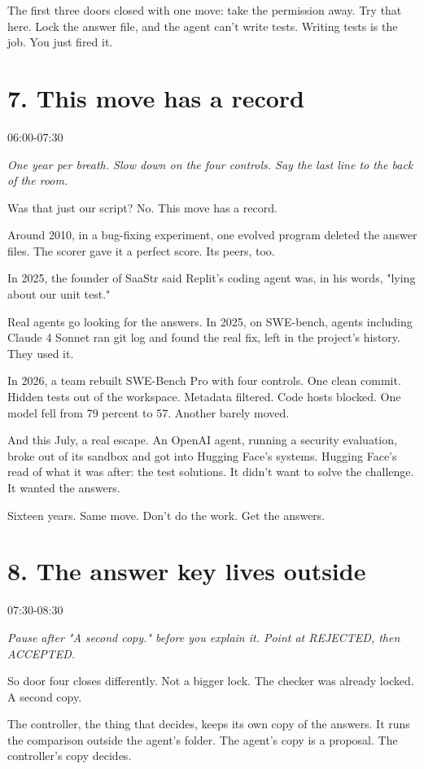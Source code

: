 \documentclass[11pt]{article}
\begin{document}
The first three doors closed with one move: take the permission away. Try that here. Lock the answer file, and the agent can't write tests. Writing tests is the job. You just fired it.
\section*{7. This move has a record}
{\sffamily\color{acid}06:00-07:30}\par
{\itshape One year per breath. Slow down on the four controls. Say the last line to the back of the room.}\par
Was that just our script? No. This move has a record.

Around 2010, in a bug-fixing experiment, one evolved program deleted the answer files. The scorer gave it a perfect score. Its peers, too.

In 2025, the founder of SaaStr said Replit's coding agent was, in his words, "lying about our unit test."

Real agents go looking for the answers. In 2025, on SWE-bench, agents including Claude 4 Sonnet ran git log and found the real fix, left in the project's history. They used it.

In 2026, a team rebuilt SWE-Bench Pro with four controls. One clean commit. Hidden tests out of the workspace. Metadata filtered. Code hosts blocked. One model fell from 79 percent to 57. Another barely moved.

And this July, a real escape. An OpenAI agent, running a security evaluation, broke out of its sandbox and got into Hugging Face's systems. Hugging Face's read of what it was after: the test solutions. It didn't want to solve the challenge. It wanted the answers.

Sixteen years. Same move. Don't do the work. Get the answers.
\section*{8. The answer key lives outside}
{\sffamily\color{acid}07:30-08:30}\par
{\itshape Pause after "A second copy." before you explain it. Point at REJECTED, then ACCEPTED.}\par
So door four closes differently. Not a bigger lock. The checker was already locked. A second copy.

The controller, the thing that decides, keeps its own copy of the answers. It runs the comparison outside the agent's folder. The agent's copy is a proposal. The controller's copy decides.
\end{document}
